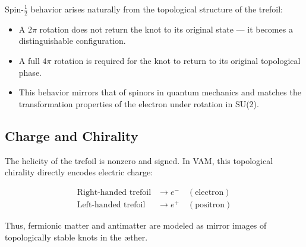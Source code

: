 Spin-\(\tfrac{1}{2}\) behavior arises naturally from the topological structure of the trefoil:

\begin{itemize}
    \item A \(2\pi\) rotation does not return the knot to its original state — it becomes a distinguishable configuration.
    \item A full \(4\pi\) rotation is required for the knot to return to its original topological phase.
    \item This behavior mirrors that of spinors in quantum mechanics and matches the transformation properties of the electron under rotation in SU(2).
\end{itemize}

\subsection{Charge and Chirality}

The helicity of the trefoil is nonzero and signed. In VAM, this topological chirality directly encodes electric charge:

\begin{align*}
\text{Right-handed trefoil} &\rightarrow e^- \quad (\text{electron}) \\
\text{Left-handed trefoil} &\rightarrow e^+ \quad (\text{positron})
\end{align*}

Thus, fermionic matter and antimatter are modeled as mirror images of topologically stable knots in the æther.

